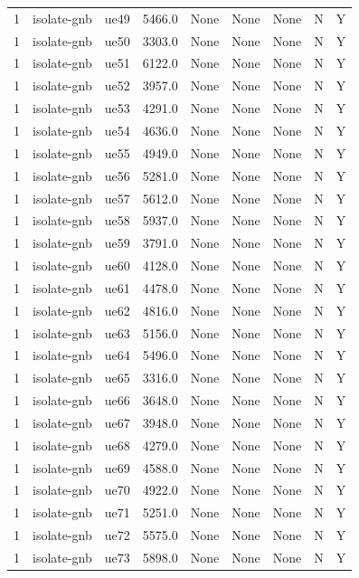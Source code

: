 \begin{table}[ht]
\begin{tabular}{|c|c|c|c|c|c|c|c|c|}
1 & isolate-gnb & ue49 & 5466.0 & None & None & None & N & Y \\
1 & isolate-gnb & ue50 & 3303.0 & None & None & None & N & Y \\
1 & isolate-gnb & ue51 & 6122.0 & None & None & None & N & Y \\
1 & isolate-gnb & ue52 & 3957.0 & None & None & None & N & Y \\
1 & isolate-gnb & ue53 & 4291.0 & None & None & None & N & Y \\
1 & isolate-gnb & ue54 & 4636.0 & None & None & None & N & Y \\
1 & isolate-gnb & ue55 & 4949.0 & None & None & None & N & Y \\
1 & isolate-gnb & ue56 & 5281.0 & None & None & None & N & Y \\
1 & isolate-gnb & ue57 & 5612.0 & None & None & None & N & Y \\
1 & isolate-gnb & ue58 & 5937.0 & None & None & None & N & Y \\
1 & isolate-gnb & ue59 & 3791.0 & None & None & None & N & Y \\
1 & isolate-gnb & ue60 & 4128.0 & None & None & None & N & Y \\
1 & isolate-gnb & ue61 & 4478.0 & None & None & None & N & Y \\
1 & isolate-gnb & ue62 & 4816.0 & None & None & None & N & Y \\
1 & isolate-gnb & ue63 & 5156.0 & None & None & None & N & Y \\
1 & isolate-gnb & ue64 & 5496.0 & None & None & None & N & Y \\
1 & isolate-gnb & ue65 & 3316.0 & None & None & None & N & Y \\
1 & isolate-gnb & ue66 & 3648.0 & None & None & None & N & Y \\
1 & isolate-gnb & ue67 & 3948.0 & None & None & None & N & Y \\
1 & isolate-gnb & ue68 & 4279.0 & None & None & None & N & Y \\
1 & isolate-gnb & ue69 & 4588.0 & None & None & None & N & Y \\
1 & isolate-gnb & ue70 & 4922.0 & None & None & None & N & Y \\
1 & isolate-gnb & ue71 & 5251.0 & None & None & None & N & Y \\
1 & isolate-gnb & ue72 & 5575.0 & None & None & None & N & Y \\
1 & isolate-gnb & ue73 & 5898.0 & None & None & None & N & Y \\

\end{tabular}
\end{table}

